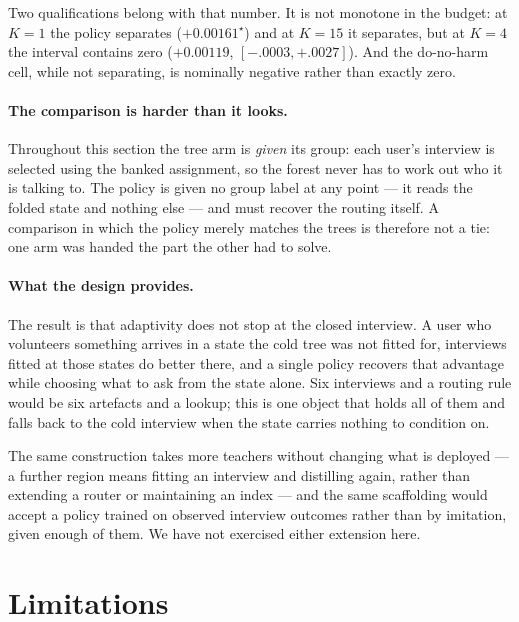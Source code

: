\documentclass[11pt]{article}
\begin{document}
Two qualifications belong with that number. It is not monotone in the budget: at $K{=}1$ the policy
separates ($+0.00161^\star$) and at $K{=}15$ it separates, but at $K{=}4$ the interval contains zero
($+0.00119$, $[-.0003,+.0027]$). And the do-no-harm cell, while not separating, is nominally
negative rather than exactly zero.

\paragraph{The comparison is harder than it looks.} Throughout this section the tree arm is
\emph{given} its group: each user's interview is selected using the banked assignment, so the forest
never has to work out who it is talking to. The policy is given no group label at any point --- it
reads the folded state and nothing else --- and must recover the routing itself. A comparison in
which the policy merely matches the trees is therefore not a tie: one arm was handed the part the
other had to solve.

\paragraph{What the design provides.} The result is that adaptivity does not stop at the closed
interview. A user who volunteers something arrives in a state the cold tree was not fitted for,
interviews fitted at those states do better there, and a single policy recovers that advantage while
choosing what to ask from the state alone. Six interviews and a routing rule would be six artefacts
and a lookup; this is one object that holds all of them and falls back to the cold interview when the
state carries nothing to condition on.

The same construction takes more teachers without changing what is deployed --- a further region
means fitting an interview and distilling again, rather than extending a router or maintaining an
index --- and the same scaffolding would accept a policy trained on observed interview outcomes
rather than by imitation, given enough of them. We have not exercised either extension here.

\section{Limitations}
\label{sec:limits}
\end{document}
